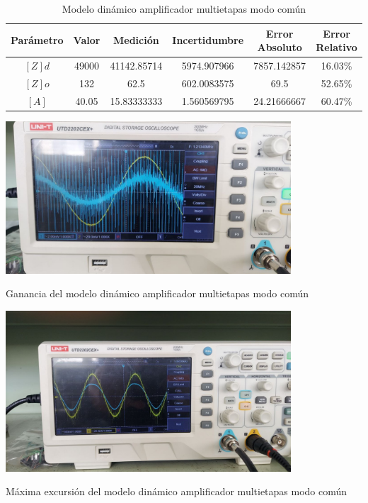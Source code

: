 \begin{table}[h!]
\centering
\begin{tabular}{|c|c|c|c|c|c|}
\hline
\textbf{Parámetro} & \textbf{Valor} & \textbf{Medición} & \textbf{Incertidumbre} & \textbf{Error Absoluto} & \textbf{Error Relativo} \\ \hline
$[Z] d$ & 49000 & 41142.85714 & 5974.907966 & 7857.142857 & 16.03\% \\ \hline
$[Z] o$ & 132 & 62.5 & 602.0083575 & 69.5 & 52.65\% \\ \hline
$[A]$ & 40.05 & 15.83333333 & 1.560569795 & 24.21666667 & 60.47\% \\ \hline
\end{tabular}
\caption{Modelo dinámico amplificador multietapas modo común}
\label{tab:med-modelo-dinamico-amplificador-multietapas-modo-comun}
\end{table}

\begin{ilustracion}
    \centering
    \includegraphics[width=0.8\textwidth]{src/images/resultados/p3/ganancia-multietapas-mod-comun.png}
    \caption{Ganancia del modelo dinámico amplificador multietapas modo común}
    \label{ilus:ganancia-multietapas-mod-comun}
\end{ilustracion}

\begin{ilustracion}[ht]
    \centering
    \includegraphics[width=0.8\textwidth]{src/images/resultados/p3/max-excursion-multietapas-mod-comun.png}
    \caption{Máxima excursión del modelo dinámico amplificador multietapas modo común}
    \label{ilus:med-max-excursion-multietapas-mod-comun}
\end{ilustracion}

